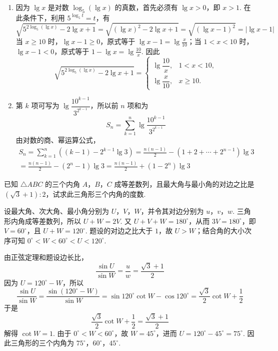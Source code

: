 \begin{solution}
\begin{enumerate}
\item 因为 \(\lg x\) 是对数 \(\log_5\left(\lg x\right)\) 的真数，首先必须有 \(\lg x>0\)，即 \(x>1\). 在此条件下，利用 \(5^{\log_5 t}=t\)，有
\[
\sqrt{5^{2\log_5\left(\lg x\right)}-2\lg x+1}
=\sqrt{\left(\lg x\right)^2-2\lg x+1}
=\sqrt{\left(\lg x-1\right)^2}=\left|\lg x-1\right|
\]
当 \(x\geqslant10\) 时，\(\lg x-1\geqslant0\)，原式等于 \(\lg x-1=\lg\frac{x}{10}\)；当 \(1<x<10\) 时，\(\lg x-1<0\)，原式等于 \(1-\lg x=\lg\frac{10}{x}\). 因此
\[
\sqrt{5^{2\log_5\left(\lg x\right)}-2\lg x+1}
=\begin{cases}
\lg\dfrac{10}{x}, & 1<x<10,\\
\lg\dfrac{x}{10}, & x\geqslant10.
\end{cases}
\]

\item 第 \(k\) 项可写为 \(\lg\dfrac{10^{k-1}}{3^{2^{k-1}}}\)，所以前 \(n\) 项和为
\[
S_n=\sum_{k=1}^{n}\lg\frac{10^{k-1}}{3^{2^{k-1}}}
\]
由对数的商、幂运算公式，
\[
\begin{gathered}
S_n=\sum_{k=1}^{n}\left((k-1)-2^{k-1}\lg3\right)
=\frac{n\left(n-1\right)}{2}-\left(1+2+\cdots+2^{n-1}\right)\lg3 \\
=\frac{n\left(n-1\right)}{2}-\left(2^n-1\right)\lg3
=\frac{n\left(n-1\right)}{2}+\left(1-2^n\right)\lg3
\end{gathered}
\]
\end{enumerate}
\end{solution}

\begin{problem}
已知 \(\triangle ABC\) 的三个内角 \(A\)，\(B\)，\(C\) 成等差数列，且最大角与最小角的对边之比是 \(\left( \sqrt{3}+1 \right):2\)，试求此三角形三个内角的度数.
\end{problem}

\begin{solution}
设最大角、次大角、最小角分别为 \(U\)，\(V\)，\(W\)，并令其对边分别为 \(u\)，\(v\)，\(w\). 三角形内角成等差数列，所以 \(U+W=2V\). 又 \(U+V+W=180^\circ\)，从而 \(3V=180^\circ\)，即 \(V=60^\circ\)，且 \(U+W=120^\circ\). 题设的对边之比大于 \(1\)，故 \(U>W\)；结合角的大小次序可知 \(0^\circ<W<60^\circ<U<120^\circ\).

由正弦定理和题设边长比，
\[
\frac{\sin U}{\sin W}=\frac{u}{w}=\frac{\sqrt{3}+1}{2}
\]
因为 \(U=120^\circ-W\)，所以
\[
\frac{\sin U}{\sin W}
=\frac{\sin\left(120^\circ-W\right)}{\sin W}
=\sin120^\circ\cot W-\cos120^\circ
=\frac{\sqrt{3}}{2}\cot W+\frac{1}{2}
\]
于是
\[
\frac{\sqrt{3}}{2}\cot W+\frac{1}{2}=\frac{\sqrt{3}+1}{2}
\]
解得 \(\cot W=1\). 由于 \(0^\circ<W<60^\circ\)，故 \(W=45^\circ\)，进而 \(U=120^\circ-45^\circ=75^\circ\). 因此三角形的三个内角为 \(75^\circ\)，\(60^\circ\)，\(45^\circ\).
\end{solution}

